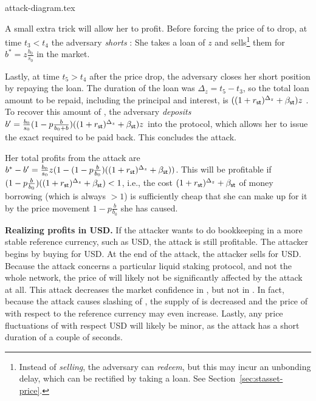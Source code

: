 {attack-diagram.tex}

A small extra trick will allow her to profit.
Before forcing the price of \stasset to drop, at time $t_3 < t_4$
the adversary \emph{shorts}
\stasset: She takes a loan of $z$ \stassets and
sells\footnote{Instead of \emph{selling}, the adversary can \emph{redeem}, but
this may incur an unbonding delay, which can be rectified by taking a loan.
See Section~\ref{sec:stasset-price}.}
them for $b^* = z \frac{b_0}{s_0}$ \asset in the market.

Lastly, at time $t_5 > t_4$ after the price drop, the adversary closes her short position by repaying the
\stasset loan. The duration of the loan was $\Delta_z = t_5 - t_3$, so the
total loan amount to be repaid, including the principal and interest, is
$((1 + r_{\textsf{st}})^{\Delta_z} + \beta_{\textsf{st}}) z$ \stasset.
To recover this amount of \stasset, the adversary \emph{deposits}
$b' = \frac{b_0}{s_0}(1 - p\frac{b}{b_0 + b}) ((1 + r_{\textsf{st}})^{\Delta_z} + \beta_{\textsf{st}}) z$ \asset
into the protocol, which allows her to issue the exact required \stasset
to be paid back. This concludes the attack.

Her total profits from the attack are
$b^* - b' = \frac{b_0}{s_0}z(1 - (1 - p\frac{b}{b_0})((1 + r_{\textsf{st}})^{\Delta_z} + \beta_{\textsf{st}}))$.
This will be profitable if $(1 - p\frac{b}{b_0})((1 + r_{\textsf{st}})^{\Delta_z} + \beta_{\textsf{st}}) < 1$,
i.e., the cost $(1 + r_{\textsf{st}})^{\Delta_z} + \beta_{\textsf{st}}$ of money borrowing (which is always $> 1$) is
sufficiently cheap that she can make up for it by the price movement
$1 - p\frac{b}{b_0}$ she has caused.

\noindent
\textbf{Realizing profits in USD.}
If the attacker wants to do bookkeeping in a more stable reference currency,
such as USD, the attack is still profitable. The attacker begins by buying
\asset for USD. At the end of the attack, the attacker sells \asset for USD.
Because the attack concerns a particular liquid staking protocol, and
not the whole \asset network, the price of \asset will likely not
be significantly affected by the attack at all.
This attack decreases the market confidence in \stasset,
but not in \asset.
In fact, because
the attack causes slashing of \asset, the supply of \asset is decreased
and the price of \asset with respect to the reference currency may
even increase.
Lastly, any price fluctuations of \asset with respect USD will likely be
minor, as the attack has a short duration of a couple of seconds.

